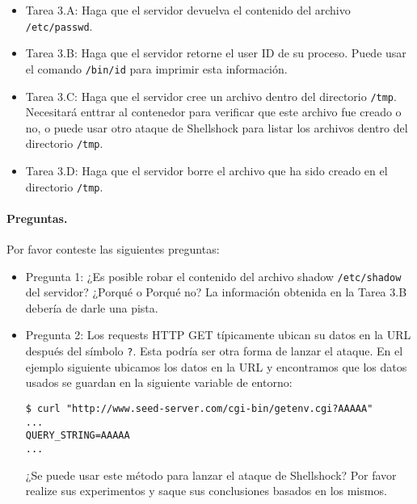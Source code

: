 \begin{itemize}
\item Tarea 3.A: Haga que el servidor devuelva el contenido del archivo \texttt{/etc/passwd}.

\item Tarea 3.B: Haga que el servidor retorne el user ID de su proceso. Puede usar el comando \texttt{/bin/id} para imprimir esta información.

\item Tarea 3.C:  Haga que el servidor cree un archivo dentro del directorio \texttt{/tmp}. Necesitará enttrar al contenedor para verificar que este archivo fue creado o no, o puede usar otro ataque de Shellshock para listar los archivos dentro del directorio \texttt{/tmp}.

\item Tarea 3.D: Haga que el servidor borre el archivo que ha sido creado en el directorio \texttt{/tmp}.
\end{itemize} 


\paragraph{Preguntas.} Por favor conteste las siguientes preguntas:
\begin{itemize}
\item Pregunta 1: ¿Es posible robar el contenido del archivo shadow \texttt{/etc/shadow} del servidor? ¿Porqué o Porqué no? 
La información obtenida en la Tarea 3.B debería de darle una pista.

\item Pregunta 2: Los requests HTTP GET típicamente ubican su datos en la URL después del símbolo \texttt{?}. Esta podría ser otra forma de lanzar el ataque. En el ejemplo siguiente ubicamos los datos en la URL y encontramos que los datos usados se guardan en la siguiente variable de entorno: 

\begin{lstlisting}
$ curl "http://www.seed-server.com/cgi-bin/getenv.cgi?AAAAA"
...
QUERY_STRING=AAAAA
...
\end{lstlisting}

¿Se puede usar este método para lanzar el ataque de Shellshock? Por favor realize sus experimentos y saque sus conclusiones basados en los mismos.
     
\end{itemize}

  


